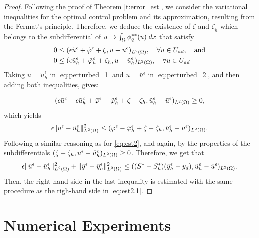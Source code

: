 {\begin{proof}
Following the proof of Theorem \ref{t:error_est}, we consider the variational inequalities for the optimal control problem and its approximation, resulting from the Fermat's principle. Therefore, we deduce the existence of  $\zeta$ and $\zeta_h$ which belongs to the subdifferential of $u\mapsto\int_{\Omega}\phi_q^{**}(u)\; dx$ that satisfy
\begin{align}
	&0 \leq  (\epsilon \tilde u^\epsilon+\tilde\varphi^\epsilon + \zeta , u - \bar u^\epsilon)_{L^2(\Omega)}, \quad \forall u \in U_{ad}, \quad \text{and} \label{eq:perturbed_1}\\
	&0 \leq  (\epsilon \tilde u^\epsilon_h+\tilde\varphi^\epsilon_h + \zeta_h , u - \tilde u^\epsilon_h)_{L^2(\Omega)}, \quad \forall u \in U_{ad} \label{eq:perturbed_2}
\end{align}
Taking $u = \tilde u^\epsilon_h$	in \eqref{eq:perturbed_1} and $u = \bar u^\epsilon$ in \eqref{eq:perturbed_2}, and  then adding both inequalities, gives:

    \begin{equation}\label{eq:theorem5_1}
    (\epsilon \bar u^{\epsilon}-\epsilon \tilde u_h^{\epsilon}+\bar\varphi^{\epsilon} -\tilde\varphi_h^{\epsilon} + \zeta - \zeta_h  , \tilde u_{h}^{\epsilon} - \bar u^{\epsilon})_{L^2(\Omega)}\ge 0,
    \end{equation}
which yields
    \begin{align*}
    \epsilon\lVert \bar{u}^{\epsilon}-\tilde u_h^{\epsilon} \rVert_{L^2(\Omega)}^2\leq 
    (\bar\varphi^{\epsilon} -\tilde\varphi_h^{\epsilon} + \zeta - \zeta_h  , \tilde u_{h}^{\epsilon} - \bar u^{\epsilon})_{L^2(\Omega)}.
    \end{align*} 
Following a similar reasoning as for \eqref{eq:est2}, and again, by the properties of the subdifferentials $(\zeta - \zeta_h , \bar u^\epsilon -\tilde u^\epsilon_h)_{L^2(\Omega)}\ge 0$. Therefore,  we get that
     \[
     \epsilon\lVert \bar{u}^{\epsilon}-\tilde u_h^{\epsilon} \rVert_{L^2(\Omega)}^2 + \|\bar y^\epsilon- \tilde y^\epsilon_h\|_{L^2(\Omega)}^2\le ((S^*-S_h^*)(\bar y^{\epsilon}_h-y_d), \tilde u_h^{\epsilon}  - \bar u^{\epsilon})_{L^2(\Omega)}.
     \]
Then, the right-hand side in the last inequality is estimated with the same procedure as the righ-hand side in \eqref{eq:est2.1}.
\end{proof}

\section{Numerical Experiments}\label{s:experiments}

}

